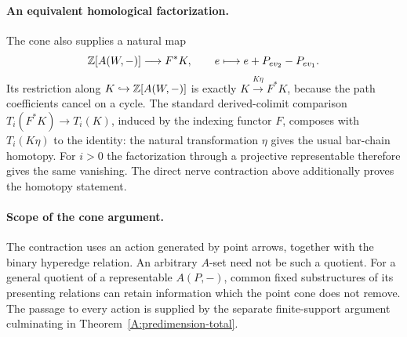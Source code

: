 \paragraph{An equivalent homological factorization.}
The cone also supplies a natural map
\[
 \mathbb Z[A(W,-)]\longrightarrow F^*K,
 \qquad e\longmapsto e+P_{ev_2}-P_{ev_1}.
\]
Its restriction along $K\hookrightarrow\mathbb Z[A(W,-)]$ is exactly
$K\xrightarrow{K\eta}F^*K$, because the path coefficients cancel
on a cycle. The standard derived-colimit comparison
$T_i(F^*K)\to T_i(K)$, induced by the indexing functor $F$,
composes with $T_i(K\eta)$ to the identity: the natural
transformation $\eta$ gives the usual bar-chain homotopy.
For $i>0$ the factorization through a projective representable
therefore gives the same vanishing. The direct nerve contraction
above additionally proves the homotopy statement.

\paragraph{Scope of the cone argument.}
The contraction uses an action generated by point arrows, together
with the binary hyperedge relation. An arbitrary $A$-set need not
be such a quotient. For a general quotient of a representable
$A(P,-)$, common fixed substructures of its presenting relations
can retain information which the point cone does not remove.
The passage to every action is supplied by the separate
finite-support argument culminating in
Theorem~\ref{A:predimension-total}.
